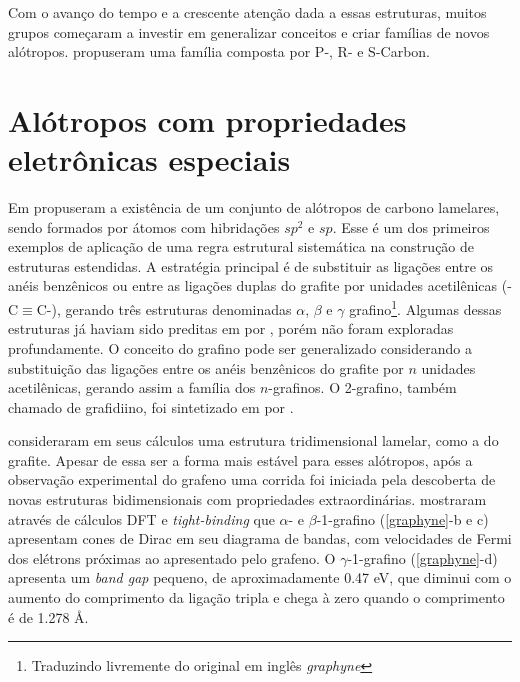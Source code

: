 		Com o avanço do tempo e a crescente atenção dada a essas estruturas, muitos grupos começaram a investir em generalizar conceitos e criar famílias de novos alótropos. \citeauthor{niu2012families} propuseram uma família composta por P-, R- e S-Carbon. 
	
	\section{Alótropos com propriedades eletrônicas especiais}
	
		Em \citeyear{baughman1987structure} \citeauthor{baughman1987structure} propuseram a existência de um conjunto de alótropos de carbono lamelares, sendo formados por átomos com hibridações $sp^2$ e $sp$. Esse é um dos primeiros exemplos de aplicação de uma regra estrutural sistemática na construção de estruturas estendidas. A estratégia principal é de substituir as ligações entre os anéis benzênicos ou entre as ligações duplas do grafite por unidades acetilênicas (-C$\equiv$C-), gerando três estruturas denominadas $\alpha$, $\beta$ e $\gamma$ grafino\footnote{Traduzindo livremente do original em inglês \textit{graphyne}}. Algumas dessas estruturas já haviam sido preditas em \citeyear{balaban1968chemical} por \citeauthor{balaban1968chemical}, porém não foram exploradas profundamente. O conceito do grafino pode ser generalizado considerando a substituição das ligações entre os anéis benzênicos do grafite por $n$ unidades acetilênicas, gerando assim a família dos $n$-grafinos. O 2-grafino, também chamado de grafidiino, foi sintetizado em \citeyear{li2010architecture} por \citeauthor{li2010architecture}.
		
		\citeauthor{baughman1987structure} consideraram em seus cálculos uma estrutura tridimensional lamelar, como a do grafite. Apesar de essa ser a forma mais estável para esses alótropos, após a observação experimental do grafeno uma corrida foi iniciada pela descoberta de novas estruturas bidimensionais com propriedades extraordinárias. \citeauthor{kim2012graphyne} mostraram através de cálculos DFT e \textit{tight-binding} que  $\alpha$- e $\beta$-1-grafino (\autoref{graphyne}-b e c) apresentam cones de Dirac em seu diagrama de bandas, com velocidades de Fermi dos elétrons próximas ao apresentado pelo grafeno. O $\gamma$-1-grafino (\autoref{graphyne}-d) apresenta um \textit{band gap} pequeno, de aproximadamente 0.47 eV, que diminui com o aumento do comprimento da ligação tripla e chega à zero quando o comprimento é de 1.278 \AA{}.
		

